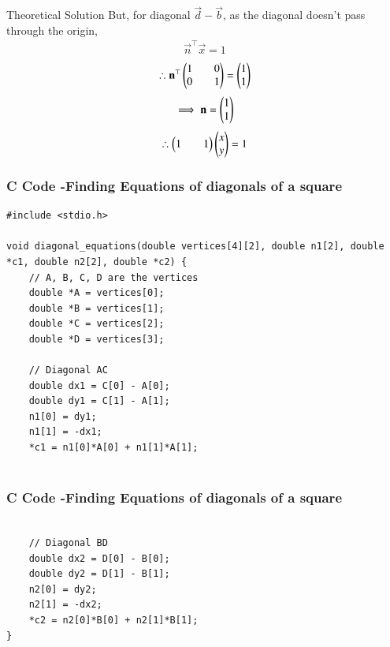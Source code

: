 \documentclass{beamer}
\begin{document}
\begin{frame}{Theoretical Solution}
But, for diagonal $\vec{d}-\vec{b}$, as the diagonal doesn't pass through the origin,
\begin{align*}
    \vec{n}^{\top}\vec{x}=1
\end{align*}
\begin{align*}
    \therefore \mathbf{n}^{\top}\begin{pmatrix}1&&0\\0&&1\end{pmatrix}=\begin{pmatrix}1\\1\end{pmatrix}
\end{align*}
\begin{align*}
    \implies \mathbf{n}=\begin{pmatrix}1\\1\end{pmatrix}
\end{align*}
\begin{align*}
    \therefore \begin{pmatrix}1&&1\end{pmatrix}\begin{pmatrix}x\\y\end{pmatrix}=1
\end{align*}
\end{frame}

\begin{frame}[fragile]
    \frametitle{C Code -Finding Equations of diagonals of a square}

    \begin{lstlisting}
#include <stdio.h>

void diagonal_equations(double vertices[4][2], double n1[2], double *c1, double n2[2], double *c2) {
    // A, B, C, D are the vertices
    double *A = vertices[0];
    double *B = vertices[1];
    double *C = vertices[2];
    double *D = vertices[3];

    // Diagonal AC
    double dx1 = C[0] - A[0];
    double dy1 = C[1] - A[1];
    n1[0] = dy1;
    n1[1] = -dx1;
    *c1 = n1[0]*A[0] + n1[1]*A[1];


    \end{lstlisting}
\end{frame}

\begin{frame}[fragile]
    \frametitle{C Code -Finding Equations of diagonals of a square}

    \begin{lstlisting}

    // Diagonal BD
    double dx2 = D[0] - B[0];
    double dy2 = D[1] - B[1];
    n2[0] = dy2;
    n2[1] = -dx2;
    *c2 = n2[0]*B[0] + n2[1]*B[1];
}
    \end{lstlisting}
\end{frame}
\end{document}
